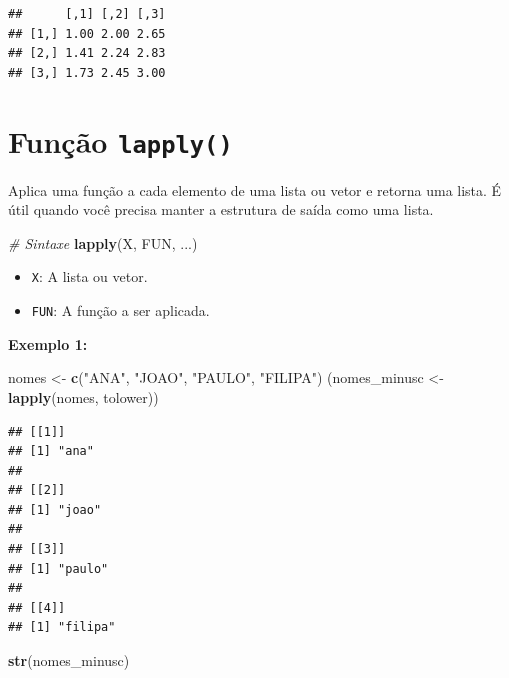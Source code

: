 \documentclass[
]{book}
\newenvironment{Shaded}{\begin{snugshade}}{\end{snugshade}}
\newcommand{\CommentTok}[1]{\textcolor[rgb]{0.56,0.35,0.01}{\textit{#1}}}
\newcommand{\FunctionTok}[1]{\textcolor[rgb]{0.13,0.29,0.53}{\textbf{#1}}}
\newcommand{\NormalTok}[1]{#1}
\newcommand{\OtherTok}[1]{\textcolor[rgb]{0.56,0.35,0.01}{#1}}
\newcommand{\StringTok}[1]{\textcolor[rgb]{0.31,0.60,0.02}{#1}}
\begin{document}
\begin{verbatim}
##      [,1] [,2] [,3]
## [1,] 1.00 2.00 2.65
## [2,] 1.41 2.24 2.83
## [3,] 1.73 2.45 3.00
\end{verbatim}

\section{\texorpdfstring{Função \texttt{lapply()}}{Função lapply()}}\label{funuxe7uxe3o-lapply}

Aplica uma função a cada elemento de uma lista ou vetor e retorna uma lista. É útil quando você precisa manter a estrutura de saída como uma lista.

\begin{Shaded}
\begin{Highlighting}[]
\CommentTok{\# Sintaxe}
\FunctionTok{lapply}\NormalTok{(X, FUN, ...)}
\end{Highlighting}
\end{Shaded}

\begin{itemize}
\item
  \texttt{X}: A lista ou vetor.
\item
  \texttt{FUN}: A função a ser aplicada.
\end{itemize}

\textbf{Exemplo 1:}

\begin{Shaded}
\begin{Highlighting}[]
\NormalTok{nomes }\OtherTok{\textless{}{-}} \FunctionTok{c}\NormalTok{(}\StringTok{"ANA"}\NormalTok{, }\StringTok{"JOAO"}\NormalTok{, }\StringTok{"PAULO"}\NormalTok{, }\StringTok{"FILIPA"}\NormalTok{)}
\NormalTok{(nomes\_minusc }\OtherTok{\textless{}{-}} \FunctionTok{lapply}\NormalTok{(nomes, tolower))}
\end{Highlighting}
\end{Shaded}

\begin{verbatim}
## [[1]]
## [1] "ana"
## 
## [[2]]
## [1] "joao"
## 
## [[3]]
## [1] "paulo"
## 
## [[4]]
## [1] "filipa"
\end{verbatim}

\begin{Shaded}
\begin{Highlighting}[]
\FunctionTok{str}\NormalTok{(nomes\_minusc) }
\end{Highlighting}
\end{Shaded}
\end{document}
